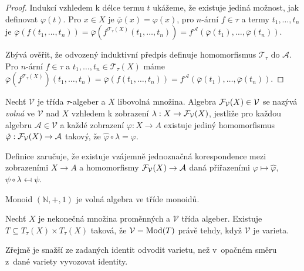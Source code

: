 \begin{proof}
Indukcí vzhledem k délce termu $t$ ukážeme, že existuje jediná možnost,
jak definovat $\varphi(t)$. Pro $x \in X$ je
$\overline{\varphi}(x) = \varphi(x)$,
pro $n$-ární $f \in \tau$ a termy $t_1, \ldots, t_n$
je $\overline{\varphi}(f(t_1,\ldots,t_n))
= \overline{\varphi}(f^{\mathcal{T}_\tau(X)}(t_1,\ldots,t_n))
= f^\mathcal{A}(\overline{\varphi}(t_1), \ldots, \overline{\varphi}(t_n))$.

Zbývá ověřit, že odvozený induktivní předpis definuje homomorfismus
$\mathcal{T}_\tau$ do $\mathcal{A}$. Pro $n$-ární $f \in \tau$ a
$t_1,\ldots, t_n \in \mathcal{T}_\tau(X)$ máme
$\overline{\varphi}(f^{\mathcal{T}_\tau(X)})(t_1,\ldots,t_n)
= \overline{\varphi}(f(t_1,\ldots,t_n))
= f^\mathcal{A}(\overline{\varphi}(t_1), \ldots, \overline{\varphi}(t_n))$.
\end{proof}

\begin{definition}
    Nechť $\mathcal{V}$ je třída $\tau$-algeber
    a $X$ libovolná množina.
    Algebra $\mathcal{F}_{\mathcal{V}}(X) \in \mathcal{V}$ se nazývá
    {\em volná} ve $\mathcal{V}$ nad $X$ vzhledem k zobrazení
    $\lambda : X \to \mathcal{F}_{\mathcal{V}}(X)$,
    jestliže pro každou algebru $\mathcal{A} \in \mathcal{V}$
    a každé zobrazení $\varphi : X \to A$ existuje jediný homomorfismus
    $\hat \varphi : \mathcal{F}_{\mathcal{V}}(X) \to \mathcal{A}$
    takový, že $\hat \varphi \circ \lambda = \varphi$.

\begin{center}
\end{center}
\end{definition}

\begin{note}
    Definice zaručuje, že existuje vzájemně jednoznačná
    korespondence mezi zobrazeními $X \to A$
    a homomorfismy $\mathcal{F}_{\mathcal{V}}(X) \to \mathcal{A}$
    daná přiřazeními $\varphi \mapsto \hat \varphi$,
    $\psi \circ \lambda \mapsfrom \psi$.
\end{note}

\begin{example}
    Monoid $(\mathbb{N}, +, 1)$ je volná algebra ve tříde monoidů.
\end{example}

\begin{theorem}[Birkhoff]
    Nechť $X$ je nekonečná množina proměnných
    a $\mathcal{V}$ třída algeber.
    Existuje
    $T \subseteq T_\tau(X) \times T_\tau(X)$
    taková, že $\mathcal{V} = \operatorname{Mod}(T)$
    právě tehdy,
    když $\mathcal{V}$ je varieta.
\end{theorem}

Zřejmě je snažší ze zadaných identit odvodit varietu, než v~opačném
směru z~dané variety vyvozovat identity.
